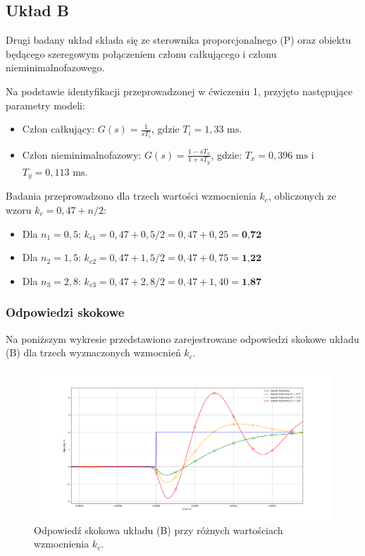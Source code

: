 \documentclass[12pt,a4paper]{article}
\begin{document}
	
	\newpage %
	
	\subsection{Układ B}
	
	Drugi badany układ składa się ze sterownika proporcjonalnego (P) oraz obiektu będącego szeregowym połączeniem członu całkującego i członu nieminimalnofazowego.
	
	Na podstawie identyfikacji przeprowadzonej w ćwiczeniu 1, przyjęto następujące parametry modeli:
	\begin{itemize}
		\item Człon całkujący: $G(s) = \frac{1}{sT_i}$, gdzie $T_i = 1,33 \text{ ms}$.
		\item Człon nieminimalnofazowy: $G(s) = \frac{1-sT_x}{1+sT_y}$, gdzie: $T_x = 0,396 \text{ ms}$ i $T_y = 0,113 \text{ ms}$.
	\end{itemize}
	
	Badania przeprowadzono dla trzech wartości wzmocnienia \(k_c\), obliczonych ze wzoru \(k_c = 0,47 + n/2\):
	\begin{itemize}
		\item Dla \(n_1 = 0,5\): $k_{c1} = 0,47 + 0,5 / 2 = 0,47 + 0,25 = \textbf{0,72}$
		\item Dla \(n_2 = 1,5\): $k_{c2} = 0,47 + 1,5 / 2 = 0,47 + 0,75 = \textbf{1,22}$
		\item Dla \(n_3 = 2,8\): $k_{c3} = 0,47 + 2,8 / 2 = 0,47 + 1,40 = \textbf{1,87}$
	\end{itemize}
	
	\subsubsection{Odpowiedzi skokowe}
	Na poniższym wykresie przedstawiono zarejestrowane odpowiedzi skokowe układu (B) dla trzech wyznaczonych wzmocnień \(k_c\).
	
	\begin{figure}[H]
	\centering
	\includegraphics[width=1\linewidth]{zdjecia/OdpSkokB.png}
	\caption{Odpowiedź skokowa układu (B) przy różnych wartościach wzmocnienia \(k_c\).}
	\label{fig:OdpSkokB}
	\end{figure}
	
\end{document}
